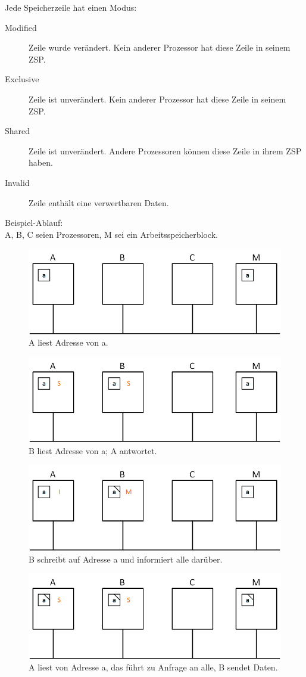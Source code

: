 Jede Speicherzeile hat einen Modus:
\begin{description}
	\item[Modified] Zeile wurde verändert. Kein anderer Prozessor hat diese Zeile in seinem ZSP.
	\item[Exclusive] Zeile ist unverändert. Kein anderer Prozessor hat diese Zeile in seinem ZSP.
	\item[Shared] Zeile ist unverändert. Andere Prozessoren können diese Zeile in ihrem ZSP haben.
	\item[Invalid] Zeile enthält eine verwertbaren Daten.
\end{description}
Beispiel-Ablauf:\\
A, B, C seien Prozessoren, M sei ein Arbeitsspeicherblock.
\begin{figure}[H]
	\begin{center}
		\includegraphics[width=.5\textwidth]{res/mesi_01}
		\caption{A liest Adresse von a.}
		\label{pic:mesi01}
	\end{center}
\end{figure} 
\begin{figure}[H]
	\begin{center}
		\includegraphics[width=.5\textwidth]{res/mesi_02}
		\caption{B liest Adresse von a; A antwortet.}
		\label{pic:mesi02}
	\end{center}
\end{figure} 
\begin{figure}[H]
	\begin{center}
		\includegraphics[width=.5\textwidth]{res/mesi_03}
		\caption{B schreibt auf Adresse a und informiert alle darüber.}
		\label{pic:mesi03}
	\end{center}
\end{figure} 
\begin{figure}[H]
	\begin{center}
		\includegraphics[width=.5\textwidth]{res/mesi_04}
		\caption{A liest von Adresse a, das führt zu Anfrage an alle, B sendet Daten.}
		\label{pic:mesi04}
	\end{center}
\end{figure} 

